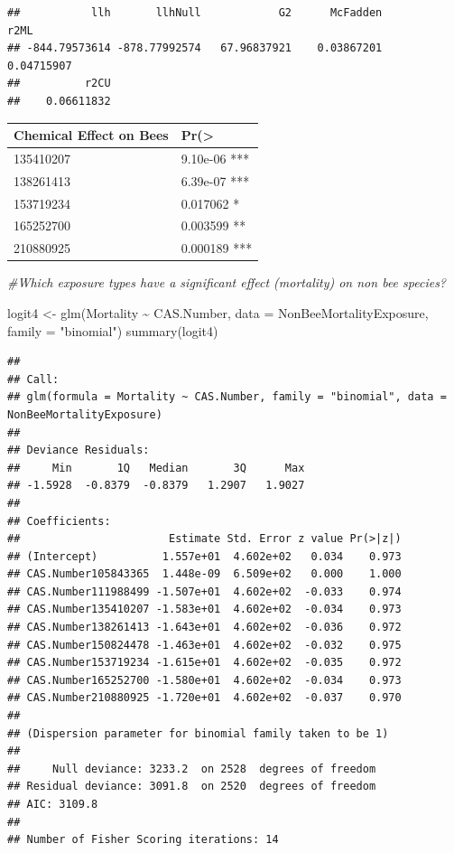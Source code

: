 \documentclass[
  12pt,
]{article}
\newenvironment{Shaded}{\begin{snugshade}}{\end{snugshade}}
\newcommand{\AttributeTok}[1]{\textcolor[rgb]{0.77,0.63,0.00}{#1}}
\newcommand{\CommentTok}[1]{\textcolor[rgb]{0.56,0.35,0.01}{\textit{#1}}}
\newcommand{\FunctionTok}[1]{\textcolor[rgb]{0.00,0.00,0.00}{#1}}
\newcommand{\NormalTok}[1]{#1}
\newcommand{\OtherTok}[1]{\textcolor[rgb]{0.56,0.35,0.01}{#1}}
\newcommand{\SpecialCharTok}[1]{\textcolor[rgb]{0.00,0.00,0.00}{#1}}
\newcommand{\StringTok}[1]{\textcolor[rgb]{0.31,0.60,0.02}{#1}}
\begin{document}
\begin{verbatim}
##           llh       llhNull            G2      McFadden          r2ML 
## -844.79573614 -878.77992574   67.96837921    0.03867201    0.04715907 
##          r2CU 
##    0.06611832
\end{verbatim}

\begin{longtable}[]{@{}ll@{}}
\toprule
Chemical Effect on Bees & Pr(\textgreater{} \\
\midrule
\endhead
135410207 & 9.10e-06 *** \\
138261413 & 6.39e-07 *** \\
153719234 & 0.017062 * \\
165252700 & 0.003599 ** \\
210880925 & 0.000189 *** \\
\bottomrule
\end{longtable}

\begin{Shaded}
\begin{Highlighting}[]
\CommentTok{\#Which exposure types have a significant effect (mortality) on non bee species?}

\NormalTok{logit4 }\OtherTok{\textless{}{-}} \FunctionTok{glm}\NormalTok{(Mortality }\SpecialCharTok{\textasciitilde{}}\NormalTok{ CAS.Number, }\AttributeTok{data =}\NormalTok{ NonBeeMortalityExposure, }\AttributeTok{family =} \StringTok{"binomial"}\NormalTok{)}
\FunctionTok{summary}\NormalTok{(logit4)}
\end{Highlighting}
\end{Shaded}

\begin{verbatim}
## 
## Call:
## glm(formula = Mortality ~ CAS.Number, family = "binomial", data = NonBeeMortalityExposure)
## 
## Deviance Residuals: 
##     Min       1Q   Median       3Q      Max  
## -1.5928  -0.8379  -0.8379   1.2907   1.9027  
## 
## Coefficients:
##                       Estimate Std. Error z value Pr(>|z|)
## (Intercept)          1.557e+01  4.602e+02   0.034    0.973
## CAS.Number105843365  1.448e-09  6.509e+02   0.000    1.000
## CAS.Number111988499 -1.507e+01  4.602e+02  -0.033    0.974
## CAS.Number135410207 -1.583e+01  4.602e+02  -0.034    0.973
## CAS.Number138261413 -1.643e+01  4.602e+02  -0.036    0.972
## CAS.Number150824478 -1.463e+01  4.602e+02  -0.032    0.975
## CAS.Number153719234 -1.615e+01  4.602e+02  -0.035    0.972
## CAS.Number165252700 -1.580e+01  4.602e+02  -0.034    0.973
## CAS.Number210880925 -1.720e+01  4.602e+02  -0.037    0.970
## 
## (Dispersion parameter for binomial family taken to be 1)
## 
##     Null deviance: 3233.2  on 2528  degrees of freedom
## Residual deviance: 3091.8  on 2520  degrees of freedom
## AIC: 3109.8
## 
## Number of Fisher Scoring iterations: 14
\end{verbatim}
\end{document}
